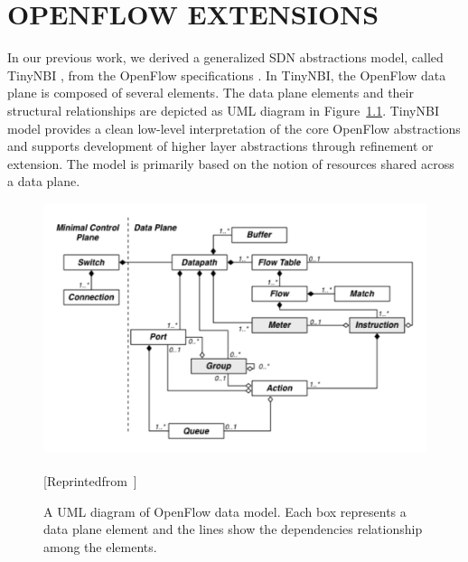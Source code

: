 \chapter{\uppercase {OpenFlow Extensions}}
\label{sec:extensions}


In our previous work, we derived a generalized SDN abstractions model, called
TinyNBI \cite{Casey:14}, from the OpenFlow specifications \cite{openflow}.
In TinyNBI, the OpenFlow data plane is composed of
several elements. The data plane elements and their structural relationships are
depicted as UML diagram in Figure~\ref{fig:data_model}. TinyNBI model provides a 
clean low-level interpretation of the core OpenFlow abstractions and supports 
development of higher layer abstractions through refinement or extension.
The model is primarily based on the notion of resources shared across a
data plane. 


\begin{figure}[t]
  \centering
  \includegraphics[scale=0.64]{figures/data_model.pdf}
  \caption[UML diagram of OpenFlow data model]{A UML diagram of OpenFlow data model. Each box represents a data
  plane element and the lines show the dependencies relationship among the
  elements.}{[Reprinted\space from\space \textsuperscript{\cite{flowgrammable}}]}
  \label{fig:data_model}
\end{figure}

